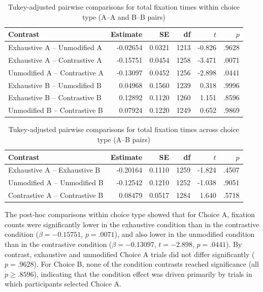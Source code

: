 \documentclass[ruler]{CUP-JNL-LIN}%
\begin{document}
\begin{table}[htbp]
\centering
\caption{Tukey-adjusted pairwise comparisons for total fixation times within choice type (A--A and B--B pairs)}
\label{tab:total-fixation-pairwise-within-choice}
\begin{tabularx}{\textwidth}{@{}Xrrrrr@{}}
\toprule
Contrast & Estimate & SE & df & $t$ & $p$ \\
\midrule
Exhaustive A -- Unmodified A   & -0.02654 & 0.0321 & 1213 & -0.826 & .9628 \\
Exhaustive A -- Contrastive A  & -0.15751 & 0.0454 & 1258 & -3.471 & .0071 \\
Unmodified A -- Contrastive A  & -0.13097 & 0.0452 & 1256 & -2.898 & .0441 \\
Exhaustive B -- Unmodified B   &  0.04968 & 0.1560 & 1239 &  0.318 & .9996 \\
Exhaustive B -- Contrastive B  &  0.12892 & 0.1120 & 1260 &  1.151 & .8596 \\
Unmodified B -- Contrastive B  &  0.07924 & 0.1220 & 1249 &  0.652 & .9869 \\
\bottomrule
\end{tabularx}
\end{table}

\begin{table}[htbp]
\centering
\caption{Tukey-adjusted pairwise comparisons for total fixation times across choice type (A--B pairs)}
\label{tab:total-fixation-pairwise-across-choice}
\begin{tabularx}{\textwidth}{@{}Xrrrrr@{}}
\toprule
Contrast & Estimate & SE & df & $t$ & $p$ \\
\midrule
Exhaustive A -- Exhaustive B   & -0.20164 & 0.1110 & 1259 & -1.824 & .4507 \\
Unmodified A -- Unmodified B   & -0.12542 & 0.1210 & 1252 & -1.038 & .9051 \\
Contrastive A -- Contrastive B &  0.08479 & 0.0517 & 1284 &  1.640 & .5718 \\
\bottomrule
\end{tabularx}
\end{table}

The post-hoc comparisons within choice type showed that for Choice A, fixation counts were significantly lower in the exhaustive condition than in the contrastive condition ($\beta=-0.15751$, $p=.0071$), and also lower in the unmodified condition than in the contrastive condition ($\beta=-0.13097$, $t=-2.898$, $p=.0441$). By contrast, exhaustive and unmodified Choice A trials did not differ significantly ($p=.9628$). For Choice B, none of the condition contrasts reached significance (all $p \ge .8596$), indicating that the condition effect was driven primarily by trials in which participants selected Choice A.
\end{document}
